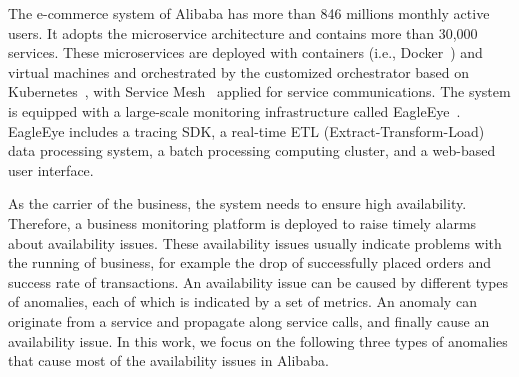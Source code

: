 
The e-commerce system of Alibaba has more than 846 millions monthly active users.
It adopts the microservice architecture and contains more than 30,000 services.
These microservices are deployed with containers (i.e., Docker~\cite{docker}) and virtual machines and orchestrated by the customized orchestrator based on Kubernetes~\cite{kubernetes}, with Service Mesh~\cite{istio} applied for service communications.
The system is equipped with a large-scale monitoring infrastructure called EagleEye~\cite{EagleEye}.
EagleEye includes a tracing SDK, a real-time ETL (Extract-Transform-Load) data processing system, a batch processing computing cluster, and a web-based user interface.

As the carrier of the business, the system needs to ensure high availability.
Therefore, a business monitoring platform is deployed to raise timely alarms about availability issues.
These availability issues usually indicate problems with the running of business, for example the drop of successfully placed orders and success rate of transactions.
An availability issue can be caused by different types of anomalies, each of which is indicated by a set of metrics.
An anomaly can originate from a service and propagate along service calls, and finally cause an availability issue.
In this work, we focus on the following three types of anomalies that cause most of the availability issues in Alibaba.

